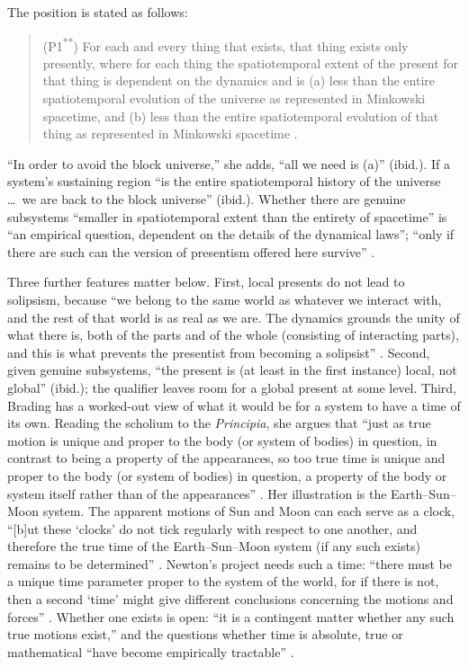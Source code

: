 \documentclass[11pt]{article}
\begin{document}
The position is stated as follows:

\begin{quote}
(P1\textsuperscript{**}) For each and every thing that exists, that thing
exists only presently, where for each thing the spatiotemporal extent of the
present for that thing is dependent on the dynamics and is (a) less than the
entire spatiotemporal evolution of the universe as represented in Minkowski
spacetime, and (b) less than the entire spatiotemporal evolution of that thing
as represented in Minkowski spacetime \citep[p.~17]{Brading2015}.
\end{quote}

``In order to avoid the block universe,'' she adds, ``all we need is (a)''
(ibid.). If a system's sustaining region ``is the entire spatiotemporal
history of the universe \ldots\ we are back to the block universe'' (ibid.).
Whether there are genuine subsystems ``smaller in spatiotemporal extent than
the entirety of spacetime'' is ``an empirical question, dependent on the
details of the dynamical laws''; ``only if there are such can the version of
presentism offered here survive'' \citep[p.~18]{Brading2015}.

Three further features matter below. First, local presents do not lead to
solipsism, because ``we belong to the same world as whatever we interact with,
and the rest of that world is as real as we are. The dynamics grounds the unity
of what there is, both of the parts and of the whole (consisting of interacting
parts), and this is what prevents the presentist from becoming a solipsist''
\citep[p.~1110]{Brading2013}. Second, given genuine subsystems, ``the present
is (at least in the first instance) local, not global'' (ibid.); the qualifier
leaves room for a global present at some level. Third, Brading has a worked-out
view of what it would be for a system to have a time of its own. Reading the
scholium to the \emph{Principia}, she argues that ``just as true motion is
unique and proper to the body (or system of bodies) in question, in contrast to
being a property of the appearances, so too true time is unique and proper to
the body (or system of bodies) in question, a property of the body or system
itself rather than of the appearances'' \citep[p.~20]{Brading2017}. Her
illustration is the Earth--Sun--Moon system. The apparent motions of Sun and
Moon can each serve as a clock, ``[b]ut these `clocks' do not tick regularly
with respect to one another, and therefore the true time of the Earth--Sun--Moon
system (if any such exists) remains to be determined'' \citep[p.~21]{Brading2017}.
Newton's project needs such a time: ``there must be a unique time parameter
proper to the system of the world, for if there is not, then a second `time'
might give different conclusions concerning the motions and forces''
\citep[p.~27]{Brading2017}. Whether one exists is open: ``it is a contingent
matter whether any such true motions exist,'' and the questions whether time is
absolute, true or mathematical ``have become empirically tractable''
\citep[p.~28]{Brading2017}.
\end{document}
